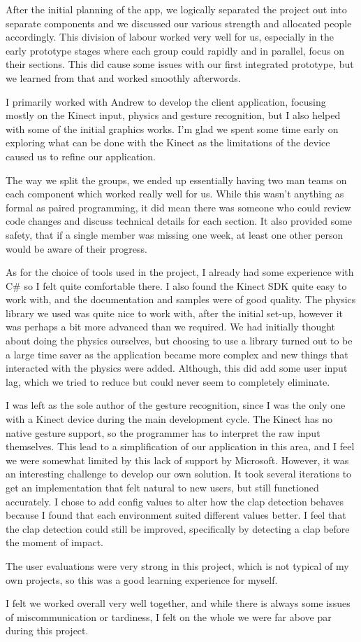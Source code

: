 After the initial planning of the app, we logically separated the project out into separate components and we discussed our various strength and allocated people accordingly.
This division of labour worked very well for us, especially in the early prototype stages where each group could rapidly and in parallel, focus on their sections.
This did cause some issues with our first integrated prototype, but we learned from that and worked smoothly afterwords.

I primarily worked with Andrew to develop the client application, focusing mostly on the Kinect input, physics and gesture recognition, but I also helped with some of the initial graphics works.
I'm glad we spent some time early on exploring what can be done with the Kinect as the limitations of the device caused us to refine our application.

The way we split the groups, we ended up essentially having two man teams on each component which worked really well for us.
While this wasn't anything as formal as paired programming, it did mean there was someone who could review code changes and discuss technical details for each section.
It also provided some safety, that if a single member was missing one week, at least one other person would be aware of their progress.

As for the choice of tools used in the project, I already had some experience with C\# so I felt quite comfortable there.
I also found the Kinect SDK quite easy to work with, and the documentation and samples were of good quality.
The physics library we used was quite nice to work with, after the initial set-up, however it was perhaps a bit more advanced than we required.
We had initially thought about doing the physics ourselves, but choosing to use a library turned out to be a large time saver as the application became more complex and new things that interacted with the physics were added.
Although, this did add some user input lag, which we tried to reduce but could never seem to completely eliminate.

I was left as the sole author of the gesture recognition, since I was the only one with a Kinect device during the main development cycle.
The Kinect has no native gesture support, so the programmer has to interpret the raw input themselves.
This lead to a simplification of our application in this area, and I feel we were somewhat limited by this lack of support by Microsoft.
However, it was an interesting challenge to develop our own solution.
It took several iterations to get an implementation that felt natural to new users, but still functioned accurately.
I chose to add config values to alter how the clap detection behaves because I found that each environment suited different values better.
I feel that the clap detection could still be improved, specifically by detecting a clap before the moment of impact.

The user evaluations were very strong in this project, which is not typical of my own projects, so this was a good learning experience for myself.

I felt we worked overall very well together, and while there is always some issues of miscommunication or tardiness, I felt on the whole we were far above par during this project.
